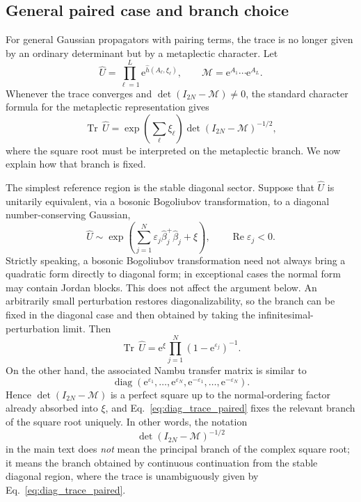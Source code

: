\documentclass[twocolumn,aps,prb,10pt,amsmath,amssymb,amsthm,superscriptaddress]{revtex4-2}
\newcommand{\Tr}{\operatorname{Tr}}
\newcommand{\diag}{\operatorname{diag}}
\newcommand{\ee}{\mathrm{e}}
\newcommand{\mc}[1]{\mathcal{#1}}
\theoremstyle{remark}
\begin{document}
\subsection{General paired case and branch choice}
\label{app:trace_paired}

For general Gaussian propagators with pairing terms, the trace is no longer given by an ordinary determinant but by a metaplectic character. Let
\begin{equation}
    \hat U = \prod_{\ell=1}^{L}\ee^{\hat h(A_\ell,\xi_\ell)},
    \qquad
    \mc M = \ee^{A_1}\cdots\ee^{A_L}.
\end{equation}
Whenever the trace converges and $\det(I_{2N}-\mc M)\neq 0$, the standard character formula for the metaplectic representation gives~\cite{thomas2008character}
\begin{equation}
    \Tr\,\hat U = \exp\!\left(\sum_{\ell}\xi_\ell\right)\det(I_{2N}-\mc M)^{-1/2},
    \label{eq:character_formula_appendix}
\end{equation}
where the square root must be interpreted on the metaplectic branch. We now explain how that branch is fixed.

The simplest reference region is the stable diagonal sector. Suppose that $\hat U$ is unitarily equivalent, via a bosonic Bogoliubov transformation, to a diagonal number-conserving Gaussian,
\begin{equation}
    \hat U \sim \exp\left(\sum_{j=1}^{N}\varepsilon_j\hat\beta_j^+\hat\beta_j + \xi\right),
    \qquad \operatorname{Re}\varepsilon_j < 0.
    \label{eq:stable_diagonal}
\end{equation}
Strictly speaking, a bosonic Bogoliubov transformation need not always bring a quadratic form directly to diagonal form; in exceptional cases the normal form may contain Jordan blocks. This does not affect the argument below. An arbitrarily small perturbation restores diagonalizability, so the branch can be fixed in the diagonal case and then obtained by taking the infinitesimal-perturbation limit.
Then
\begin{equation}
    \Tr\,\hat U = \ee^{\xi}\prod_{j=1}^{N}(1-\ee^{\varepsilon_j})^{-1}.
    \label{eq:diag_trace_paired}
\end{equation}
On the other hand, the associated Nambu transfer matrix is similar to
\begin{equation}
    \diag\left(\ee^{\varepsilon_1},\ldots,\ee^{\varepsilon_N},\ee^{-\varepsilon_1},\ldots,\ee^{-\varepsilon_N}\right).
\end{equation}
Hence $\det(I_{2N}-\mc M)$ is a perfect square up to the normal-ordering factor already absorbed into $\xi$, and Eq.~\eqref{eq:diag_trace_paired} fixes the relevant branch of the square root uniquely. In other words, the notation
\begin{equation}
    \det(I_{2N}-\mc M)^{-1/2}
\end{equation}
in the main text does \emph{not} mean the principal branch of the complex square root; it means the branch obtained by continuous continuation from the stable diagonal region, where the trace is unambiguously given by Eq.~\eqref{eq:diag_trace_paired}.
\end{document}
